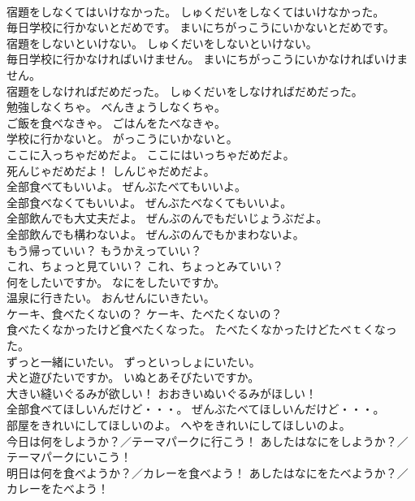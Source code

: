\documentclass[8pt]{extreport}
\begin{document}
\begin{CJK}{UTF8}{min}
\\	宿題をしなくてはいけなかった。	しゅくだいをしなくてはいけなかった。 
\\	毎日学校に行かないとだめです。	まいにちがっこうにいかないとだめです。 
\\	宿題をしないといけない。	しゅくだいをしないといけない。 
\\	毎日学校に行かなければいけません。	まいにちがっこうにいかなければいけません。 
\\	宿題をしなければだめだった。	しゅくだいをしなければだめだった。 
\\	勉強しなくちゃ。	べんきょうしなくちゃ。 
\\	ご飯を食べなきゃ。	ごはんをたべなきゃ。 
\\	学校に行かないと。	がっこうにいかないと。 
\\	ここに入っちゃだめだよ。	ここにはいっちゃだめだよ。 
\\	死んじゃだめだよ！	しんじゃだめだよ。 
\\	全部食べてもいいよ。	ぜんぶたべてもいいよ。 
\\	全部食べなくてもいいよ。	ぜんぶたべなくてもいいよ。 
\\	全部飲んでも大丈夫だよ。	ぜんぶのんでもだいじょうぶだよ。 
\\	全部飲んでも構わないよ。	ぜんぶのんでもかまわないよ。 
\\	もう帰っていい？	もうかえっていい？ 
\\	これ、ちょっと見ていい？	これ、ちょっとみていい？ 
\\	何をしたいですか。	なにをしたいですか。 
\\	温泉に行きたい。	おんせんにいきたい。 
\\	ケーキ、食べたくないの？	ケーキ、たべたくないの？ 
\\	食べたくなかったけど食べたくなった。	たべたくなかったけどたべｔくなった。 
\\	ずっと一緒にいたい。	ずっといっしょにいたい。 
\\	犬と遊びたいですか。	いぬとあそびたいですか。 
\\	大きい縫いぐるみが欲しい！	おおきいぬいぐるみがほしい！ 
\\	全部食べてほしいんだけど・・・。	ぜんぶたべてほしいんだけど・・・。 
\\	部屋をきれいにしてほしいのよ。	へやをきれいにしてほしいのよ。 
\\	今日は何をしようか？／テーマパークに行こう！	あしたはなにをしようか？／テーマパークにいこう！ 
\\	明日は何を食べようか？／カレーを食べよう！	あしたはなにをたべようか？／カレーをたべよう！ 

\end{CJK}
\end{document}
